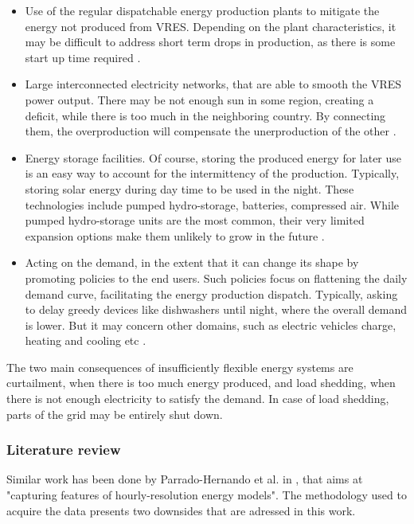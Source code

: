 \begin{itemize}
    \item Use of the regular dispatchable energy production plants to mitigate the energy not produced from VRES. Depending on the plant characteristics, it may be difficult to address short term drops in production, as there is some start up time required \cite{flexibility-storage-planning}.
    \item Large interconnected electricity networks, that are able to smooth the VRES power output. There may be not enough sun in some region, creating a deficit, while there is too much in the neighboring country. By connecting them, the overproduction will compensate the unerproduction of the other \cite{flexibility-connection}.
    \item Energy storage facilities. Of course, storing the produced energy for later use is an easy way to account for the intermittency of the production. Typically, storing solar energy during day time to be used in the night. These technologies include pumped hydro-storage, batteries, compressed air. While pumped hydro-storage units are the most common, their very limited expansion options make them unlikely to grow in the future \cite{flexibility-demdandside-forecasts-storage}.
    \item Acting on the demand, in the extent that it can change its shape by promoting policies to the end users. Such policies focus on flattening the daily demand curve, facilitating the energy production dispatch. Typically, asking to delay greedy devices like dishwashers until night, where the overall demand is lower. But it may concern other domains, such as electric vehicles charge, heating and cooling etc \cite{flexibility-demdandside-forecasts-storage}.
\end{itemize}

The two main consequences of insufficiently flexible energy systems are curtailment, when there is too much energy produced, and load shedding, when there is not enough electricity to satisfy the demand. In case of load shedding, parts of the grid may be entirely shut down.

\subsubsection{Literature review}

Similar work has been done by Parrado-Hernando et al. in \cite{Hernando2022}, that aims at "capturing features of hourly-resolution energy models". The methodology used to acquire the data presents two downsides that are adressed in this work.

